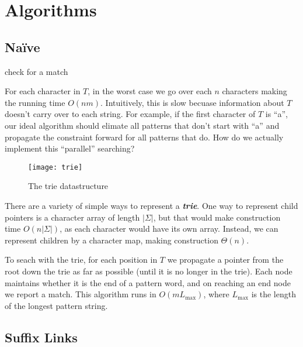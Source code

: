 \documentclass[11pt, oneside]{article}
\newcommand{\emphasis}[1]{\textbf{\textit{#1}}}
\begin{document}
\newpage

\section{Algorithms}
\subsection{Naïve}

\begin{algorithm}
  \begin{algorithmic}[h!]
            \State check for a match
          \EndFor
      \EndFor
    \EndProcedure
  \end{algorithmic}
\end{algorithm}

For each character in \( T \), in the worst case we go over each \( n \)
characters making the running time \( O(nm) \). Intuitively, this is slow
becuase information about \( T \) doesn't carry over to each string.
For example, if the first character of \( T \) is ``a'', our ideal algorithm should
elimate all patterns that don't start with ``a'' and propagate the constraint
forward for all patterns that do. How do we actually implement this ``parallel'' searching?

\begin{figure}[h!]
\centering
\texttt{[image: trie]}
\caption{The trie datastructure}
\end{figure}

There are a variety of simple ways to represent a \emphasis{trie}.
One way to represent child pointers is a character array of length \( |\Sigma| \),
but that would make construction time \( O(n |\Sigma|) \), as each character would have its own array.
Instead, we can represent children by a character map, making construction \( \Theta(n) \).

To seach with the trie, for each position in \( T \) we propagate a pointer from the root down the trie as far as possible (until it is no longer in the trie).
Each node maintains whether it is the end of a pattern word, and on reaching an end node we report a match.
This algorithm runs in \( O(m L_\text{max}) \), where \( L_\text{max} \) is the length of the longest pattern string.

\subsection{Suffix Links}
\end{document}
